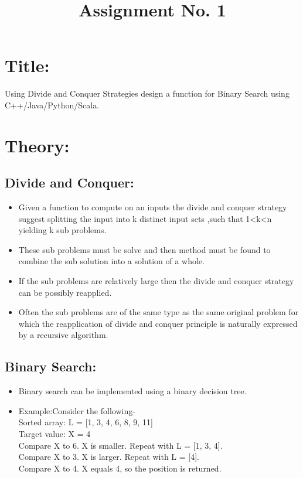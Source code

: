 \documentclass{article}
\date{}
\title{Assignment No. 1}
\begin{document}
	
	\maketitle
	
	\section{Title:}
	Using Divide and Conquer Strategies design a function for Binary Search using C++/Java/Python/Scala.
	
	
	\section{Theory:}
	
	\subsection{Divide and Conquer:}
	
	\begin{itemize}
		
		\item Given a function to compute on an inputs the divide and conquer strategy suggest splitting the input into k distinct input sets ,such that 1<k<n yielding k sub problems.\\
		\item These sub problems must be solve and then method must be found to combine the sub solution into a solution of a whole.\\
		\item If the sub problems are relatively large then the divide and conquer strategy can be possibly reapplied.\\
		\item Often the sub problems are of the same type as the same original problem for which the reapplication of divide and conquer principle is naturally expressed by a recursive algorithm.\\
		
	\end{itemize}
	
	\subsection{Binary Search:}
	
	\begin{itemize}
		
		\item Binary search can be implemented using a binary decision tree.\\
		\item Example:Consider the following-\\
		Sorted array: L = [1, 3, 4, 6, 8, 9, 11] \\
		Target value: X = 4\\
		Compare X to 6. X is smaller. Repeat with L = [1, 3, 4].\\
		Compare X to 3. X is larger. Repeat with L = [4].\\
		Compare X to 4. X equals 4, so the position is returned.\\
		
	\end{itemize}
	
\end{document}
